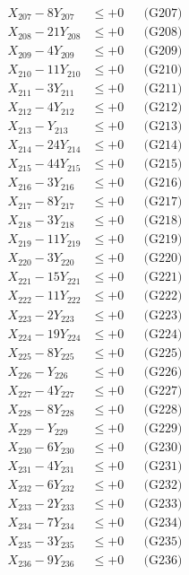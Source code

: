 \documentclass[a4paper,10pt]{article}
\begin{document}
{\begin{align}
X_{207} - 8Y_{207} &\leq +0 && \text{(G207)} \\
X_{208} - 21Y_{208} &\leq +0 && \text{(G208)} \\
X_{209} - 4Y_{209} &\leq +0 && \text{(G209)} \\
X_{210} - 11Y_{210} &\leq +0 && \text{(G210)} \\
X_{211} - 3Y_{211} &\leq +0 && \text{(G211)} \\
X_{212} - 4Y_{212} &\leq +0 && \text{(G212)} \\
X_{213} - Y_{213} &\leq +0 && \text{(G213)} \\
\allowbreak
X_{214} - 24Y_{214} &\leq +0 && \text{(G214)} \\
X_{215} - 44Y_{215} &\leq +0 && \text{(G215)} \\
X_{216} - 3Y_{216} &\leq +0 && \text{(G216)} \\
X_{217} - 8Y_{217} &\leq +0 && \text{(G217)} \\
X_{218} - 3Y_{218} &\leq +0 && \text{(G218)} \\
X_{219} - 11Y_{219} &\leq +0 && \text{(G219)} \\
X_{220} - 3Y_{220} &\leq +0 && \text{(G220)} \\
X_{221} - 15Y_{221} &\leq +0 && \text{(G221)} \\
X_{222} - 11Y_{222} &\leq +0 && \text{(G222)} \\
X_{223} - 2Y_{223} &\leq +0 && \text{(G223)} \\
\allowbreak
X_{224} - 19Y_{224} &\leq +0 && \text{(G224)} \\
X_{225} - 8Y_{225} &\leq +0 && \text{(G225)} \\
X_{226} - Y_{226} &\leq +0 && \text{(G226)} \\
X_{227} - 4Y_{227} &\leq +0 && \text{(G227)} \\
X_{228} - 8Y_{228} &\leq +0 && \text{(G228)} \\
X_{229} - Y_{229} &\leq +0 && \text{(G229)} \\
X_{230} - 6Y_{230} &\leq +0 && \text{(G230)} \\
X_{231} - 4Y_{231} &\leq +0 && \text{(G231)} \\
X_{232} - 6Y_{232} &\leq +0 && \text{(G232)} \\
X_{233} - 2Y_{233} &\leq +0 && \text{(G233)} \\
\allowbreak
X_{234} - 7Y_{234} &\leq +0 && \text{(G234)} \\
X_{235} - 3Y_{235} &\leq +0 && \text{(G235)} \\
X_{236} - 9Y_{236} &\leq +0 && \text{(G236)} \\

\end{align}}
\end{document}
